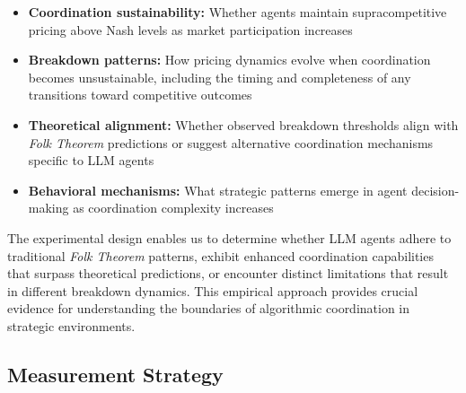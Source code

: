 \begin{itemize}
    \item \textbf{Coordination sustainability:} Whether agents maintain supracompetitive pricing above Nash levels as market participation increases
    \item \textbf{Breakdown patterns:} How pricing dynamics evolve when coordination becomes unsustainable, including the timing and completeness of any transitions toward competitive outcomes  
    \item \textbf{Theoretical alignment:} Whether observed breakdown thresholds align with \emph{Folk Theorem} predictions or suggest alternative coordination mechanisms specific to LLM agents
    \item \textbf{Behavioral mechanisms:} What strategic patterns emerge in agent decision-making as coordination complexity increases
\end{itemize}

The experimental design enables us to determine whether LLM agents adhere to traditional \emph{Folk Theorem} patterns, exhibit enhanced coordination capabilities that surpass theoretical predictions, or encounter distinct limitations that result in different breakdown dynamics. This empirical approach provides crucial evidence for understanding the boundaries of algorithmic coordination in strategic environments.

\subsection{Measurement Strategy}
